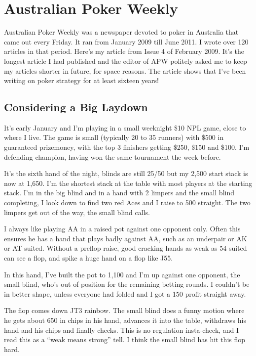 \chapter{Australian Poker Weekly}


Australian Poker Weekly was a newspaper devoted to poker in Australia
that came out every Friday. It ran from January 2009 till June 2011.
I wrote over 120 articles in that period. Here's my article from Issue
4 of February 2009. It's the longest article I had published and the
editor of APW politely asked me to keep my articles shorter in future,
for space reasons. The article shows that I've been writing on
poker strategy for at least sixteen years!

\section{Considering a Big Laydown}

It's early January and I'm playing in a small weeknight \$10 NPL game,
close to where I live. The game is small (typically 20 to 35 runners) with
\$500 in guaranteed prizemoney, with the top 3 finishers getting \$250, \$150
and \$100. I'm defending champion, having won the same tournament
the week before.

It's the sixth hand of the night, blinds are still 25/50 but
my 2,500 start stack is now at 1,650. I'm the shortest stack at the
table with most players at the starting stack. I'm in the big blind and
in a hand with 2 limpers and the small blind completing, I look down to
find two red Aces and I raise to 500 straight. The two limpers get out
of the way, the small blind calls.

I always like playing AA in a raised pot against one opponent only.
Often this ensures he has a hand that plays badly against AA, such as
an underpair or AK or AT suited. Without a preflop raise, good
cracking hands as weak as 54 suited can see a flop, and spike a huge
hand on a flop like J55.

In this hand, I've built the pot to 1,100 and I'm up against one
opponent, the small blind, who's out of position for the remaining
betting rounds. I couldn't be in better shape, unless everyone had
folded and I got a 150 profit straight away.

The flop comes down JT3 rainbow. The small blind does a funny motion
where he gets about 650 in chips in his hand, advances it into the
table, withdraws his hand and his chips and finally checks. This is
no regulation insta-check, and I read this as a ``weak means strong''
tell. I think the small blind has hit this flop hard.

